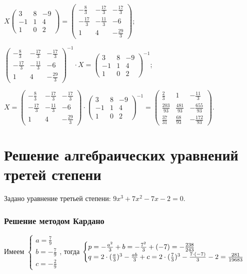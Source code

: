 \documentclass[14pt]{extreport}
\begin{document}
${X}\begin{pmatrix}3&8&-9\\-1&1&4\\1&0&2 \end{pmatrix} = \begin{pmatrix}-\frac{8}{3}&-\frac{17}{3}&-\frac{17}{3}\\-\frac{17}{3}&-\frac{11}{3}&-6\\1&4&-\frac{29}{3}\end{pmatrix}$;

$\begin{pmatrix}-\frac{8}{3}&-\frac{17}{3}&-\frac{17}{3}\\-\frac{17}{3}&-\frac{11}{3}&-6\\1&4&-\frac{29}
{3}\end{pmatrix}^{-1}\cdot{X} = \begin{pmatrix}3&8&-9\\-1&1&4\\1&0&2\end{pmatrix}^{-1}$;

${X} = \begin{pmatrix}-\frac{8}{3}&-\frac{17}{3}&-\frac{17}{3}\\ -\frac{17}{3}&-\frac{11}{3}&-6\\1&4&-\frac{29}{3}\end{pmatrix}\cdot\begin{pmatrix}3&8&-9\\-1&1&4\\1&0&2 \end{pmatrix}^{-1} = \begin{pmatrix}\frac{2}{3}&1&-\frac{11}{3}\\\frac{203}{93}&\frac{481}{93}&-\frac{655}{93}\\\frac{37}{31}&\frac{68}{93}&-\frac{172}{93}\end{pmatrix}$.


\section{Решение алгебраических уравнений третей степени}

Задано уравнение третьей степени: $9x^3 + 7x^2 - 7x - 2 = 0$.

\subsubsection{Решение методом Кардано}

Имеем $\begin{cases}a = \frac{7}{9}\\ b = -\frac{7}{9}\\c = -\frac{2}{9}\end{cases}$, тогда 
$\begin{cases}p = -{{a^2}\over{3}} + b =
-{{7^2}\over{3}}+(-7) =-\frac{238}{243}\\q = 2\cdot({{a}\over{3}})^3 - {{ab}\over{3}}+ c =
2\cdot({{7}\over{3}})^3 - {{7\cdot(-7)}\over{3}}-2 =\frac{281}{19683}\end{cases}$
\end{document}
